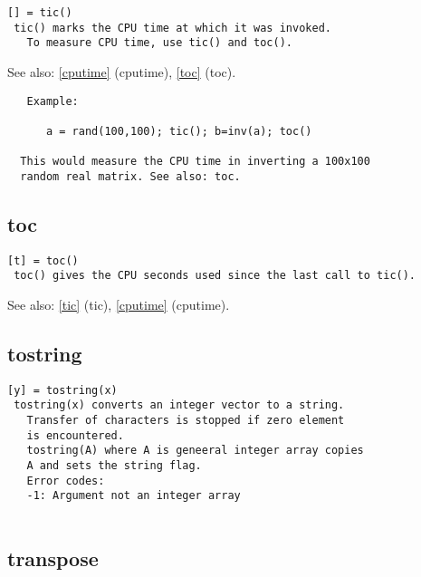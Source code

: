 \documentclass[a4paper]{article}
\begin{document}
\begin{tscreen}
\begin{verbatim}
[] = tic()
 tic() marks the CPU time at which it was invoked.
   To measure CPU time, use tic() and toc().
\end{verbatim}

See also: \ref{cputime} {(cputime)}, \ref{toc} {(toc)}.
\begin{verbatim}
   Example:

      a = rand(100,100); tic(); b=inv(a); toc()

  This would measure the CPU time in inverting a 100x100
  random real matrix. See also: toc. 
\end{verbatim}
\end{tscreen}



\subsection{toc\label{toc}}

\begin{tscreen}
\begin{verbatim}
[t] = toc()
 toc() gives the CPU seconds used since the last call to tic().
\end{verbatim}

See also: \ref{tic} {(tic)}, \ref{cputime} {(cputime)}.
\end{tscreen}



\subsection{tostring\label{tostring}}

\begin{tscreen}
\begin{verbatim}
[y] = tostring(x)
 tostring(x) converts an integer vector to a string.
   Transfer of characters is stopped if zero element
   is encountered.
   tostring(A) where A is geneeral integer array copies
   A and sets the string flag.
   Error codes:
   -1: Argument not an integer array
   
\end{verbatim}
\end{tscreen}



\subsection{transpose\label{transpose}}
\end{document}
